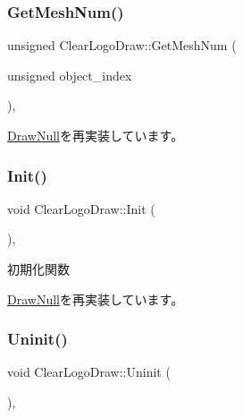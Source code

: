 \subsubsection{\texorpdfstring{Get\+Mesh\+Num()}{GetMeshNum()}}
{\footnotesize\ttfamily unsigned Clear\+Logo\+Draw\+::\+Get\+Mesh\+Num (\begin{DoxyParamCaption}\item[{unsigned}]{object\+\_\+index }\end{DoxyParamCaption})\hspace{0.3cm}{\ttfamily [override]}, {\ttfamily [virtual]}}



\mbox{\hyperlink{class_draw_null_ad735978a85a5f3583eecd82d6bfe6413}{Draw\+Null}}を再実装しています。

\mbox{\label{class_clear_logo_draw_a9af656c0a8ebfb5fa133a0983add6ffd}} 
\subsubsection{\texorpdfstring{Init()}{Init()}}
{\footnotesize\ttfamily void Clear\+Logo\+Draw\+::\+Init (\begin{DoxyParamCaption}{ }\end{DoxyParamCaption})\hspace{0.3cm}{\ttfamily [override]}, {\ttfamily [virtual]}}



初期化関数 



\mbox{\hyperlink{class_draw_null_acd7fef3ccea1da537ac9507ffbb6dd2e}{Draw\+Null}}を再実装しています。

\mbox{\label{class_clear_logo_draw_aa73db5b701e644f8e552ddb254a0a9aa}} 
\subsubsection{\texorpdfstring{Uninit()}{Uninit()}}
{\footnotesize\ttfamily void Clear\+Logo\+Draw\+::\+Uninit (\begin{DoxyParamCaption}{ }\end{DoxyParamCaption})\hspace{0.3cm}{\ttfamily [override]}, {\ttfamily [virtual]}}



